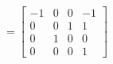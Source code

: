 \documentclass[preview]{standalone}
\begin{document}
\begin{center}
$ = \begin{bmatrix}-1 & 0 & 0 & -1 \\ 0 & 0 & 1 & 1 \\ 0 & 1 & 0 & 0\\ 0 & 0 & 0 & 1\end{bmatrix}$
\end{center}
\end{document}
